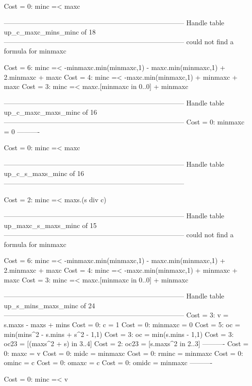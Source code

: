 Cost =  0:  minc =< maxc

--------------------------------------------------------------------------------
Handle table up_c_maxc_mins_minc of 18
--------------------------------------------------------------------------------
could not find a formula for minmaxc

Cost =  6:  minc =< -minmaxc.min(minmaxc,1) - maxc.min(minmaxc,1) + 2.minmaxc + maxc
Cost =  4:  minc =< -maxc.min(minmaxc,1) + minmaxc + maxc
Cost =  3:  minc =< maxc.[minmaxc in 0..0] + minmaxc

--------------------------------------------------------------------------------
Handle table up_c_maxc_maxs_minc of 16
--------------------------------------------------------------------------------
Cost =  0:  minmaxc = 0
----------

Cost =  0:  minc =< maxc

--------------------------------------------------------------------------------
Handle table up_c_s_maxs_minc of 16
--------------------------------------------------------------------------------

Cost =  2:  minc =< maxs.(s div c)

--------------------------------------------------------------------------------
Handle table up_maxc_s_maxs_minc of 15
--------------------------------------------------------------------------------
could not find a formula for minmaxc

Cost =  6:  minc =< -minmaxc.min(minmaxc,1) - maxc.min(minmaxc,1) + 2.minmaxc + maxc
Cost =  4:  minc =< -maxc.min(minmaxc,1) + minmaxc + maxc
Cost =  3:  minc =< maxc.[minmaxc in 0..0] + minmaxc

--------------------------------------------------------------------------------
Handle table up_s_mins_maxs_minc of 24
--------------------------------------------------------------------------------
Cost =  3:  v       = s.maxs - maxs + mins
Cost =  0:  c       = 1
Cost =  0:  minmaxc = 0
Cost =  5:  oc      = min(mins^2 - s.mins + s^2 - 1,1)
Cost =  3:  oc      = min(s.mins - 1,1)
Cost =  3:  oc23    = [(maxs^2 + s) in 3..4]
Cost =  2:  oc23    = [s.maxs^2 in 2..3]
----------
Cost =  0:  maxc    = v
Cost =  0:  midc    = minmaxc
Cost =  0:  rminc   = minmaxc
Cost =  0:  ominc   = c
Cost =  0:  omaxc   = c
Cost =  0:  omidc   = minmaxc
----------

Cost =  0:  minc =< v
